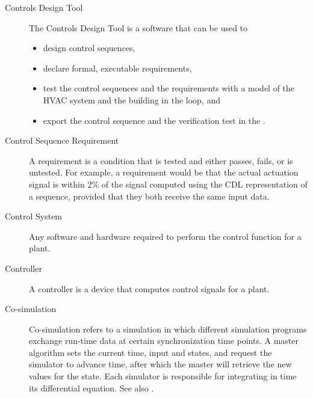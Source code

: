 \documentclass[letterpaper,10pt, openany,english]{sphinxmanual}
\begin{document}
\begin{description}
\item[{Controls Design Tool\label{\detokenize{glossary:term-controls-design-tool}}}] \leavevmode
The Controls Design Tool is a software that can be used to
\begin{itemize}
\item {} 
design control sequences,

\item {} 
declare formal, executable requirements,

\item {} 
test the control sequences and the requirements with a model
of the HVAC system and the building in the loop, and

\item {} 
export the control sequence and the verification test
in the {\hyperref[\detokenize{glossary:term-controls-description-language}]{}}.

\end{itemize}

\item[{Control Sequence Requirement\label{\detokenize{glossary:term-control-sequence-requirement}}}] \leavevmode
A requirement is a condition that is tested and either passes, fails,
or is untested. For example, a requirement would be that the actual
actuation signal is within 2\% of the signal computed using the CDL
representation of a sequence, provided that they both receive the same
input data.

\item[{Control System\label{\detokenize{glossary:term-control-system}}}] \leavevmode
Any software and hardware required to perform the control function for a plant.

\item[{Controller\label{\detokenize{glossary:term-controller}}}] \leavevmode
A controller is a device that computes control signals for a plant.

\item[{Co-simulation\label{\detokenize{glossary:term-co-simulation}}}] \leavevmode
Co-simulation refers to a simulation in which different simulation programs
exchange run-time data at certain synchronization time points.
A master algorithm sets the current time, input and states,
and request the simulator to advance time, after which the
master will retrieve the new values for the state.
Each simulator is responsible for integrating in time its
differential equation. See also {\hyperref[\detokenize{glossary:term-model-exchange}]{}}.


\end{description}
\end{document}
